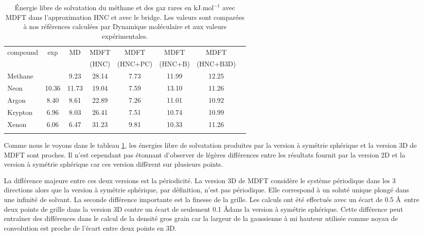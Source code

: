 \begin{table}
  \centering
  \begin{tabular}{ l c c c c c c c }
    \hline & \\[-1em]\hline
    compound   & exp  & MD & MDFT & MDFT & MDFT  & MDFT \\
               &      &    & (HNC)  & (HNC+PC)  & (HNC+B) & (HNC+B3D) \\
    \hline
    Methane    &       &  9.23 & 28.14 & 7.73 & 11.99 & 12.25 \\
    Neon       & 10.36 & 11.73 & 19.04 & 7.59 & 13.10 & 11.26 \\
    Argon      &  8.40 &  8.61 & 22.89 & 7.26 & 11.01 & 10.92 \\
    Krypton    &  6.96 &  8.03 & 26.41 & 7.51 & 10.74 & 10.99 \\
    Xenon      &  6.06 &  6.47 & 31.23 & 9.81 & 10.33 & 11.26 \\
    \hline & \\[-1em]\hline
  \end{tabular}
  \caption[\'Energie libre de solvatation du méthane et des gaz rares.]{\'Energie libre de solvatation du méthane et des gaz rares en $\mathrm{kJ}.\mathrm{mol}^{-1}$ avec MDFT dans l'approximation HNC et avec le bridge. Les valeurs sont comparées à nos références calculées par Dynamique moléculaire et aux valeurs expérimentales\cite{straatsma_free_1986}.}
  \label{tab:deltag_1D_3D}  
\end{table}

Comme nous le voyons dans le tableau \ref{tab:deltag_1D_3D}, les énergies libre de solvatation produites par la version à symétrie sphérique et la version 3D de MDFT sont proches. Il n'est cependant pas étonnant d'observer de légères différences entre les résultats fournit par la version 2D et la version à symétrie sphérique car ces version diffèrent sur plusieurs points. 


La différence majeure entre ces deux versions est la périodicité. La version 3D de MDFT considère le système périodique dans les 3 directions alors que la version à symétrie sphérique, par définition, n'est pas périodique. Elle correspond à un soluté unique plongé dans une infinité de solvant. La seconde différence importante est la finesse de la grille. Les calculs ont été effectués avec un écart de 0.5 \AA\ entre deux points de grille dans la version 3D contre un écart de seulement 0.1 \AA dans la version à symétrie sphérique. Cette différence peut entraîner des différences dans le calcul de la densité gros grain car la largeur de la gaussienne à mi hauteur utilisée comme noyau de convolution est proche de l'écart entre deux points en 3D.


